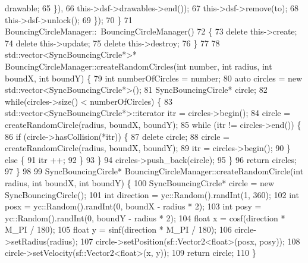 \begin{DoxyCodeInclude}
      drawable;
65                                                                                          \}),
66                                                                           this->dsf->drawables->end());
67                                               this->dsf->remove(to);
68                                               this->dsf->unlock();
69                                           \});
70 \}
71 BouncingCircleManager::~BouncingCircleManager()
72 \{
73     \textcolor{keyword}{delete} this->create;
74     \textcolor{keyword}{delete} this->update;
75     \textcolor{keyword}{delete} this->destroy;
76 \}
77 
78 std::vector<SyncBouncingCircle*>* BouncingCircleManager::createRandomCircles(\textcolor{keywordtype}{int} number, \textcolor{keywordtype}{int} radius, \textcolor{keywordtype}{int} 
      boundX, \textcolor{keywordtype}{int} boundY) \{
79     \textcolor{keywordtype}{int} numberOfCircles = number;
80     \textcolor{keyword}{auto} circles = \textcolor{keyword}{new} std::vector<SyncBouncingCircle*>();
81     SyncBouncingCircle* circle;
82     \textcolor{keywordflow}{while}(circles->size() < numberOfCircles) \{
83         std::vector<SyncBouncingCircle*>::iterator itr = circles->begin();
84         circle = createRandomCircle(radius, boundX, boundY);
85         \textcolor{keywordflow}{while} (itr != circles->end()) \{
86             \textcolor{keywordflow}{if} (circle->hasCollision(*itr)) \{
87                 \textcolor{keyword}{delete} circle;
88                 circle = createRandomCircle(radius, boundX, boundY);
89                 itr = circles->begin();
90             \} \textcolor{keywordflow}{else} \{
91                 itr ++;
92             \}
93         \}
94         circles->push\_back(circle);
95     \}
96     \textcolor{keywordflow}{return} circles;
97 \}
98 
99 SyncBouncingCircle*  BouncingCircleManager::createRandomCircle(\textcolor{keywordtype}{int} radius, \textcolor{keywordtype}{int} boundX, \textcolor{keywordtype}{int} boundY) \{
100     SyncBouncingCircle* circle = \textcolor{keyword}{new} SyncBouncingCircle();
101     \textcolor{keywordtype}{int} direction = yc::Random().randInt(1, 360);
102     \textcolor{keywordtype}{int} posx = yc::Random().randInt(0, boundX - radius * 2);
103     \textcolor{keywordtype}{int} posy = yc::Random().randInt(0, boundY - radius * 2);
104     \textcolor{keywordtype}{float} x = cosf(direction * M\_PI / 180);
105     \textcolor{keywordtype}{float} y = sinf(direction * M\_PI / 180);
106     circle->setRadius(radius);
107     circle->setPosition(sf::Vector2<float>(posx, posy));
108     circle->setVelocity(sf::Vector2<float>(x, y));
109     \textcolor{keywordflow}{return} circle;
110 \}
\end{DoxyCodeInclude}
